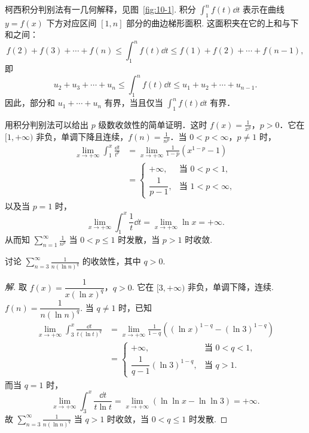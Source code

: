 柯西积分判别法有一几何解释，见图~\ref{fig:10-1}. 积分 $\displaystyle\int_{1}^{n}f(t)\dd t$ 表示在曲线 $y=f(x)$ 下方对应区间 $[1,n]$ 部分的曲边梯形面积. 这面积夹在它的上和与下和之间：
\[
f(2)+f(3)+\cdots+f(n)\leqslant\int_{1}^{n}f(t)\dd t\leqslant f(1)+f(2)+\cdots+f(n-1),
\]
即
\[
u_{2}+u_{3}+\cdots+u_{n}\leqslant\int_{1}^{n}f(t)\dd t\leqslant u_{1}+u_{2}+\cdots+u_{n-1}.
\]
因此，部分和 $u_1+\cdots+u_n$ 有界，当且仅当 $\displaystyle\int_1^n f(t)\dd t$ 有界．

用积分判别法可以给出 $p$ 级数收敛性的简单证明．这时 $f(x)=\frac{1}{x^{p}}$，$p>0$．它在 $[1,+\infty)$ 非负，单调下降且连续，$f(n)=\frac{1}{n^{p}}$．当 $0<p<\infty$，$p\neq1$ 时，
\[
\begin{aligned}
\lim_{x\to+\infty}\int_{1}^{x}\frac{\dd t}{t^{p}}&=\lim_{x\to+\infty}\frac{1}{1-p}(x^{1-p}-1)\\
&=\begin{cases}
+\infty, & \text{当 }0<p<1,\\[2pt]
\dfrac{1}{p-1}, & \text{当 }1<p<\infty,
\end{cases}
\end{aligned}
\]
以及当 $p=1$ 时，
\[
\lim_{x\to+\infty}\int_{1}^{x}\frac{1}{t}\dd t=\lim_{x\to+\infty}\ln x=+\infty.
\]
从而知 $\sum_{n=1}^{\infty}\frac{1}{n^{p}}$ 当 $0<p\leq1$ 时发散，当 $p>1$ 时收敛.

\begin{example}\label{ex:10-3-8}
讨论 $\displaystyle\sum_{n=3}^{\infty}\frac{1}{n(\ln n)^{q}}$ 的收敛性，其中 $q>0$.
\end{example}

\begin{proof}[解]
取 $f(x)=\dfrac{1}{x(\ln x)^q}$，$q>0$. 它在 $[3,+\infty)$ 非负，单调下降，连续. $f(n)=\dfrac{1}{n(\ln n)^q}$. 当 $q\neq1$ 时，已知
\[
\begin{aligned}
\lim_{x\to+\infty}\int_{3}^{x}\frac{\dd t}{t(\ln t)^{q}}&=\lim_{x\to+\infty}\frac{1}{1-q}\left((\ln x)^{1-q}-(\ln 3)^{1-q}\right)\\
&=\begin{cases}
+\infty, & \text{当 }0<q<1,\\[2pt]
\dfrac{1}{q-1}(\ln 3)^{1-q}, & \text{当 }q>1.
\end{cases}
\end{aligned}
\]
而当 $q=1$ 时，
\[
\lim_{x\to+\infty}\int_{3}^{x}\frac{\dd t}{t\ln t}=\lim_{x\to+\infty}\left(\ln\ln x-\ln\ln 3\right)=+\infty.
\]
故 $\displaystyle\sum_{n=3}^{\infty}\frac{1}{n(\ln n)^{q}}$ 当 $q>1$ 时收敛，当 $0<q\leqslant1$ 时发散.
\end{proof}

